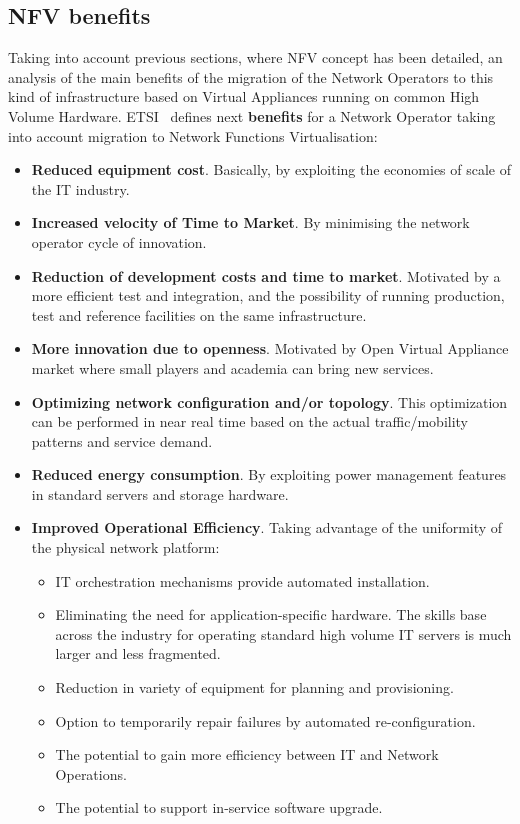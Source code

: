 \documentclass[a4paper, 12pt]{book}
\begin{document}
\subsection{NFV benefits}
\label{subsec:nvfbenefits}

Taking into account previous sections, where NFV concept has been detailed, an analysis of the main benefits of the migration of the Network Operators to this kind of infrastructure based on Virtual Appliances running on common High Volume Hardware. ETSI~\cite{ETSINFVDefinition} defines next \textbf{benefits} for a Network Operator taking into account migration to Network Functions Virtualisation:

\begin{itemize}\itemsep0pt
 \item{\textbf{Reduced equipment cost}}. Basically, by exploiting the economies of scale of the IT industry.
 \item{\textbf{Increased velocity of Time to Market}}. By minimising the network operator cycle of innovation.
 \item{\textbf{Reduction of development costs and time to market}}. Motivated by a more efficient test and integration, and the possibility of running production, test and reference facilities on the same infrastructure.
 \item{\textbf{More innovation due to openness}}. Motivated by Open Virtual Appliance market where small players and academia can bring new services.
 \item{\textbf{Optimizing network configuration and/or topology}}. This optimization can be performed in near real time based on the actual traffic/mobility patterns and service demand.
 \item{\textbf{Reduced energy consumption}}. By exploiting power management features in standard servers and storage hardware.
 \item{\textbf{Improved Operational Efficiency}}. Taking advantage of the uniformity of the physical network platform:
 \begin{itemize}\itemsep0pt
    \item{IT orchestration mechanisms provide automated installation}.
    \item{Eliminating the need for application-specific hardware}. The skills base across the industry for operating standard high volume IT servers is much larger and less fragmented.
    \item{Reduction in variety of equipment for planning and provisioning}.
    \item{Option to temporarily repair failures by automated re-configuration}.
    \item{The potential to gain more efficiency between IT and Network Operations}.
    \item{The potential to support in-service software upgrade}.
 \end{itemize}
\end{itemize}
\end{document}
